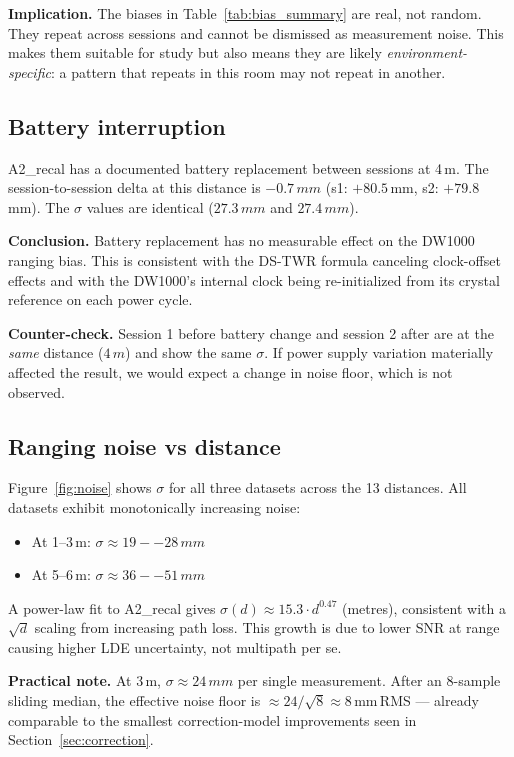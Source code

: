 \documentclass[10pt,a4paper,twocolumn]{article}
\begin{document}
\textbf{Implication.}  The biases in Table~\ref{tab:bias_summary} are real,
not random.  They repeat across sessions and cannot be dismissed as
measurement noise.  This makes them suitable for study but also means they
are likely \emph{environment-specific}: a pattern that repeats in this room
may not repeat in another.

\subsection{Battery interruption}
\label{sec:battery}

A2\_recal has a documented battery replacement between sessions at
4\,m.  The session-to-session delta at this distance is
$-0.7\,mm$ (s1: $+80.5$\,mm, s2: $+79.8$\,mm).  The $\sigma$ values
are identical ($27.3\,mm$ and $27.4\,mm$).

\textbf{Conclusion.}  Battery replacement has no measurable effect on
the DW1000 ranging bias.  This is consistent with the DS-TWR formula
canceling clock-offset effects and with the DW1000's internal clock being
re-initialized from its crystal reference on each power cycle.

\textbf{Counter-check.}  Session 1 before battery change and session 2 after
are at the \emph{same} distance ($4\,m$) and show the same $\sigma$.
If power supply variation materially affected the result, we would expect
a change in noise floor, which is not observed.

\subsection{Ranging noise vs distance}

Figure~\ref{fig:noise} shows $\sigma$ for all three datasets across the 13
distances.  All datasets exhibit monotonically increasing noise:
\begin{itemize}[noitemsep]
\item At 1--3\,m: $\sigma \approx 19--28\,mm$
\item At 5--6\,m: $\sigma \approx 36--51\,mm$
\end{itemize}

A power-law fit to A2\_recal gives $\sigma(d) \approx 15.3 \cdot d^{0.47}$
(metres), consistent with a $\sqrt{d}$ scaling from increasing path loss.
This growth is due to lower SNR at range causing higher LDE uncertainty,
not multipath per se.

\textbf{Practical note.}  At 3\,m, $\sigma \approx 24\,mm$ per
single measurement.  After an 8-sample sliding median, the effective noise
floor is $\approx 24/\sqrt{8} \approx 8$\,mm\,RMS --- already
comparable to the smallest correction-model improvements seen in
Section~\ref{sec:correction}.
\end{document}
